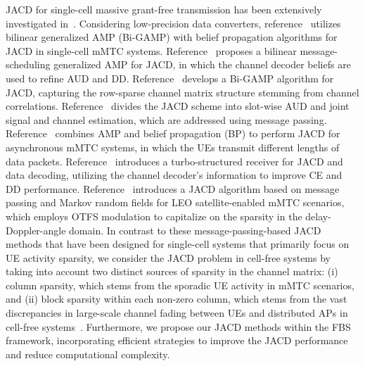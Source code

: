 JACD for single-cell massive grant-free transmission has been extensively investigated in~\cite{zou2020alow, Di2022joint, zhang2023joint, jiang2020joint, bai2023deep, Bian2023joint, shen2023joint}.
%
Considering low-precision data converters, reference~\cite{zou2020alow} utilizes bilinear generalized AMP (Bi-GAMP) with belief propagation algorithms for JACD in single-cell mMTC systems.
%
Reference~\cite{Di2022joint} proposes a bilinear message-scheduling generalized AMP for JACD, in which the channel decoder beliefs are used to refine AUD and DD.
%
Reference~\cite{zhang2023joint} develops a Bi-GAMP algorithm for JACD,  capturing the row-sparse channel matrix structure stemming from channel correlations.
%
Reference~\cite{jiang2020joint} divides the JACD scheme into slot-wise AUD and joint signal and channel estimation, which are addressed using message passing.
%
Reference~\cite{bai2023deep} combines AMP and belief propagation (BP) to perform JACD for asynchronous mMTC systems, in which the UEs transmit different lengths of data packets.
%
Reference~\cite{Bian2023joint} introduces a turbo-structured receiver for JACD and data decoding, utilizing the channel decoder's information to improve CE and DD performance.
%
Reference~\cite{shen2023joint} introduces a JACD algorithm based on message passing and Markov random fields for LEO satellite-enabled mMTC scenarios, which employs OTFS modulation to capitalize on the sparsity in the delay-Doppler-angle domain.
%
In contrast to these message-passing-based JACD methods that have been designed for single-cell systems that primarily focus on UE activity sparsity, we consider the JACD problem in cell-free systems by taking into account two distinct sources of sparsity in the channel matrix: (i) column sparsity, which stems from the sporadic UE activity in mMTC scenarios, and (ii) block sparsity within each non-zero column, which stems from the vast discrepancies in large-scale channel fading between UEs and distributed APs in cell-free systems~\cite{song2022joint}. 
%
Furthermore, we propose our JACD methods within the FBS framework, incorporating efficient strategies to improve the JACD performance and reduce computational complexity.



